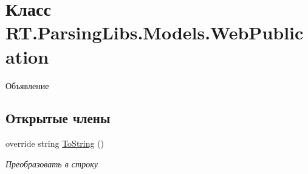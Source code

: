 \hypertarget{class_r_t_1_1_parsing_libs_1_1_models_1_1_web_publication}{\section{Класс R\+T.\+Parsing\+Libs.\+Models.\+Web\+Publication}
\label{class_r_t_1_1_parsing_libs_1_1_models_1_1_web_publication}
}


Объявление  


\subsection*{Открытые члены}
\begin{DoxyCompactItemize}
\item 
override string \hyperlink{class_r_t_1_1_parsing_libs_1_1_models_1_1_web_publication_a80d88cd1f8ff7cbdf496a5fec5a879bf}{To\+String} ()
\begin{DoxyCompactList}\small\item\em Преобразовать в строку \end{DoxyCompactList}\end{DoxyCompactItemize}
